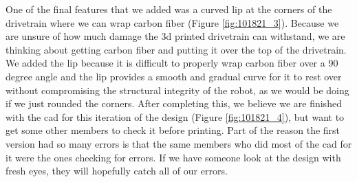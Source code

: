 One of the final features that we added was a curved lip at the corners of the drivetrain where we can wrap carbon fiber (Figure \ref{fig:101821_3}). Because we are unsure of how much damage the 3d printed drivetrain can withstand, we are thinking about getting carbon fiber and putting it over the top of the drivetrain. We added the lip because it is difficult to properly wrap carbon fiber over a 90 degree angle and the lip provides a smooth and gradual curve for it to rest over without compromising the structural integrity of the robot, as we would be doing if we just rounded the corners. After completing this, we believe we are finished with the cad for this iteration of the design (Figure \ref{fig:101821_4}), but want to get some other members to check it before printing. Part of the reason the first version had so many errors is that the same members who did most of the cad for it were the ones checking for errors. If we have someone look at the design with fresh eyes, they will hopefully catch all of our errors.

 


